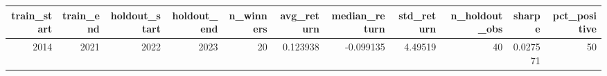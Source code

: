 \begin{tabular}{rrrrrrrrrrr}
\toprule
train_start & train_end & holdout_start & holdout_end & n_winners & avg_return & median_return & std_return & n_holdout_obs & sharpe & pct_positive \\
\midrule
2014 & 2021 & 2022 & 2023 & 20 & 0.123938 & -0.099135 & 4.49519 & 40 & 0.027571 & 50 \\
\bottomrule
\end{tabular}
